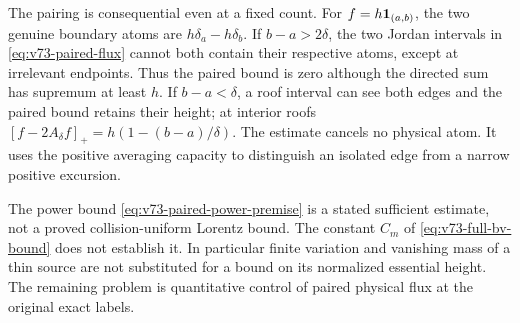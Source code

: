 The pairing is consequential even at a fixed count. For
$f=h\mathbf1_{(a,b)}$, the two genuine boundary atoms are
$h\delta_a-h\delta_b$. If $b-a>2\delta$, the two Jordan intervals
in \eqref{eq:v73-paired-flux} cannot both contain their respective
atoms, except at irrelevant endpoints. Thus the paired bound is
zero although the directed sum has supremum at least $h$. If
$b-a<\delta$, a roof interval can see both edges and the paired
bound retains their height; at interior roofs
$[f-2A_\delta f]_+=h(1-(b-a)/\delta)$. The estimate cancels no
physical atom. It uses the positive averaging capacity to distinguish
an isolated edge from a narrow positive excursion.

The power bound \eqref{eq:v73-paired-power-premise} is a stated
sufficient estimate, not a proved collision-uniform Lorentz bound.
The constant $C_m$ of \eqref{eq:v73-full-bv-bound} does not establish
it. In particular finite variation and vanishing mass of a thin
source are not substituted for a bound on its normalized essential
height. The remaining problem is quantitative control of paired
physical flux at the original exact labels.
